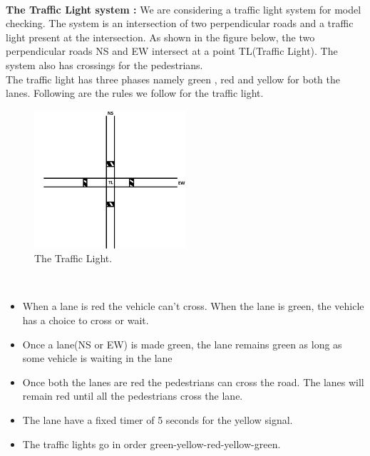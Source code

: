 \documentclass[conference]{IEEEtran}
\begin{document}
\\
\noindent \textbf{The Traffic Light system : }
We are considering a traffic light system for model checking. The system is an intersection of two perpendicular roads and a traffic light present at the intersection. As shown in the figure below, the two perpendicular roads NS and EW intersect at a point TL(Traffic Light). The system also has crossings for the pedestrians.
\\

The traffic light has three phases namely green , red and yellow for both the lanes. Following are the rules we follow for the traffic light.
\\
\begin{figure}[H]
    \centering
    \includegraphics[width=0.5\textwidth]{road.png}
    \caption{The Traffic Light.}
\end{figure}
\\
\begin{itemize}
    \item When a lane is red the vehicle can’t cross. When the lane is green, the vehicle has a choice to cross or wait.
    \item Once a lane(NS or EW) is made green, the lane remains green as long as some vehicle is waiting in the lane
    \item Once both the lanes are red the pedestrians can cross the road. The lanes will remain red until all the pedestrians cross the lane.
    \item The lane have a fixed timer of 5 seconds for the yellow signal.
    \item The traffic lights go in order green-yellow-red-yellow-green.

\end{itemize}
\end{document}
